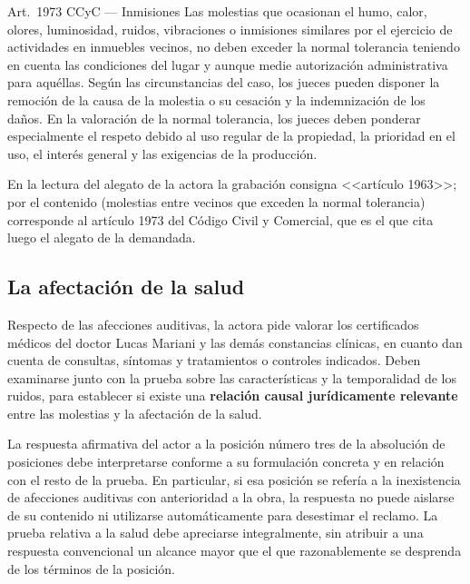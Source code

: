 \documentclass[12pt,oneside]{book}
\begin{document}
\begin{norma}{Art.~1973 CCyC --- Inmisiones}
Las molestias que ocasionan el humo, calor, olores, luminosidad, ruidos, vibraciones o inmisiones similares por el ejercicio de actividades en inmuebles vecinos, no deben exceder la normal tolerancia teniendo en cuenta las condiciones del lugar y aunque medie autorizaci\'on administrativa para aqu\'ellas. Seg\'un las circunstancias del caso, los jueces pueden disponer la remoci\'on de la causa de la molestia o su cesaci\'on y la indemnizaci\'on de los da\~nos. En la valoraci\'on de la normal tolerancia, los jueces deben ponderar especialmente el respeto debido al uso regular de la propiedad, la prioridad en el uso, el inter\'es general y las exigencias de la producci\'on.
\end{norma}

\begin{note}
En la lectura del alegato de la actora la grabaci\'on consigna <<art\'iculo 1963>>; por el contenido (molestias entre vecinos que exceden la normal tolerancia) corresponde al art\'iculo 1973 del C\'odigo Civil y Comercial, que es el que cita luego el alegato de la demandada.
\end{note}

\subsection{La afectaci\'on de la salud}

Respecto de las afecciones auditivas, la actora pide valorar los certificados m\'edicos del doctor Lucas Mariani y las dem\'as constancias cl\'inicas, en cuanto dan cuenta de consultas, s\'intomas y tratamientos o controles indicados. Deben examinarse junto con la prueba sobre las caracter\'isticas y la temporalidad de los ruidos, para establecer si existe una \textbf{relaci\'on causal jur\'idicamente relevante} entre las molestias y la afectaci\'on de la salud.

La respuesta afirmativa del actor a la posici\'on n\'umero tres de la absoluci\'on de posiciones debe interpretarse conforme a su formulaci\'on concreta y en relaci\'on con el resto de la prueba. En particular, si esa posici\'on se refer\'ia a la inexistencia de afecciones auditivas con anterioridad a la obra, la respuesta no puede aislarse de su contenido ni utilizarse autom\'aticamente para desestimar el reclamo. La prueba relativa a la salud debe apreciarse integralmente, sin atribuir a una respuesta convencional un alcance mayor que el que razonablemente se desprenda de los t\'erminos de la posici\'on.
\end{document}
